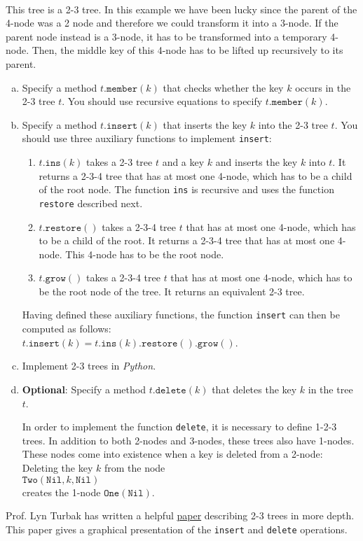 \\[0.2cm]
This tree is a 2-3 tree.  In this example we have been lucky since the parent of the 4-node was
a 2 node and therefore we could transform it into a 3-node.  If the parent node instead is a 3-node,
it has to be transformed into a temporary 4-node.  Then, the middle key of this 4-node has to be
lifted up recursively to its parent.  
\begin{enumerate}[(a)]
\item Specify a method $t.\texttt{member}(k)$ that checks whether the key $k$ occurs in the 2-3 tree
      $t$.  You should use recursive equations to specify  $t.\texttt{member}(k)$.
\item Specify a method $t.\texttt{insert}(k)$ that inserts the key $k$ into the 2-3 tree
      $t$.  You should use three auxiliary functions to implement \texttt{insert}:
      \begin{enumerate}
      \item $t.\texttt{ins}(k)$ takes a 2-3 tree $t$ and a key $k$ and inserts the key $k$ into $t$.
            It returns a 2-3-4 tree that has at most one 4-node, which has to be a child of the root
            node.  The function \texttt{ins} is recursive and uses the function \texttt{restore} described
            next. 
      \item $t.\texttt{restore}()$ takes a 2-3-4 tree $t$ that has at most one 4-node, which has to be a child
            of the root.  It returns a 2-3-4 tree that has at most one 4-node.  This 4-node has to be the root node.
      \item $t.\texttt{grow}()$ takes a 2-3-4 tree $t$ that has at most one 4-node, which has to be the root
            node of the tree.  It returns an equivalent 2-3 tree.
      \end{enumerate}
      Having defined these auxiliary functions, the function \texttt{insert} can then be computed as follows:
      \\[0.2cm]
      \hspace*{1.3cm}
      $t.\texttt{insert}(k) = t.\texttt{ins}(k).\texttt{restore}().\texttt{grow}()$.
\item Implement 2-3 trees in \textsl{Python}.
\item \textbf{Optional}: Specify a method $t.\texttt{delete}(k)$ that deletes the key $k$ in the tree $t$.

      In order to implement the function \texttt{delete}, it is necessary to define 1-2-3 trees.
      In addition to both 2-nodes and 3-nodes, these trees also have 1-nodes.  These nodes come into existence
      when a key is deleted from a 2-node:  Deleting the key $k$ from the node
      \\[0.2cm]
      \hspace*{1.3cm}
      $\texttt{Two}(\texttt{Nil}, k, \texttt{Nil})$
      \\[0.2cm]
      creates the 1-node $\texttt{One}(\texttt{Nil})$.
\end{enumerate}
Prof. Lyn Turbak has written a helpful
\href{http://www.cs.princeton.edu/~dpw/courses/cos326-12/ass/2-3-trees.pdf}{paper} describing 2-3 trees in more
depth.  This paper gives a graphical presentation of the \texttt{insert} and \texttt{delete} operations.

